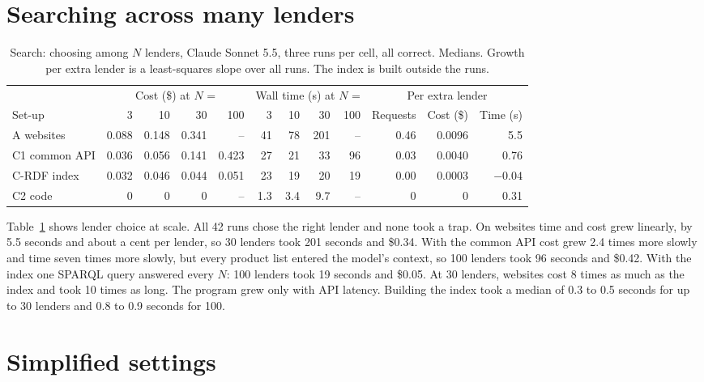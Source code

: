 \documentclass[11pt]{article}
\begin{document}
\section{Searching across many lenders}\label{sec:search}

\begin{table}[t]
\centering
\footnotesize
\setlength{\tabcolsep}{3.2pt}
\begin{tabular}{lrrrrrrrrrrr}
\toprule
& \multicolumn{4}{c}{Cost (\$) at $N$ =} & \multicolumn{4}{c}{Wall time (s) at $N$ =} & \multicolumn{3}{c}{Per extra lender} \\
\cmidrule(lr){2-5}\cmidrule(lr){6-9}\cmidrule(lr){10-12}
Set-up & 3 & 10 & 30 & 100 & 3 & 10 & 30 & 100 & Requests & Cost (\$) & Time (s) \\
\midrule
A websites & 0.088 & 0.148 & 0.341 & -- & 41 & 78 & 201 & -- & 0.46 & 0.0096 & 5.5 \\
C1 common API & 0.036 & 0.056 & 0.141 & 0.423 & 27 & 21 & 33 & 96 & 0.03 & 0.0040 & 0.76 \\
C-RDF index & 0.032 & 0.046 & 0.044 & 0.051 & 23 & 19 & 20 & 19 & 0.00 & 0.0003 & $-0.04$ \\
C2 code & 0 & 0 & 0 & -- & 1.3 & 3.4 & 9.7 & -- & 0 & 0 & 0.31 \\
\bottomrule
\end{tabular}
\caption{Search: choosing among $N$ lenders, Claude Sonnet 5.5, three runs per cell, all correct. Medians. Growth per extra lender is a least-squares slope over all runs. The index is built outside the runs.}
\label{tab:search}
\end{table}

Table~\ref{tab:search} shows lender choice at scale. All 42 runs chose the right lender and none took a trap. On websites time and cost grew linearly, by 5.5 seconds and about a cent per lender, so 30 lenders took 201 seconds and \$0.34. With the common API cost grew 2.4 times more slowly and time seven times more slowly, but every product list entered the model's context, so 100 lenders took 96 seconds and \$0.42. With the index one SPARQL query answered every $N$: 100 lenders took 19 seconds and \$0.05. At 30 lenders, websites cost 8 times as much as the index and took 10 times as long. The program grew only with API latency. Building the index took a median of 0.3 to 0.5 seconds for up to 30 lenders and 0.8 to 0.9 seconds for 100.

\section{Simplified settings}\label{sec:simplified}
\end{document}
